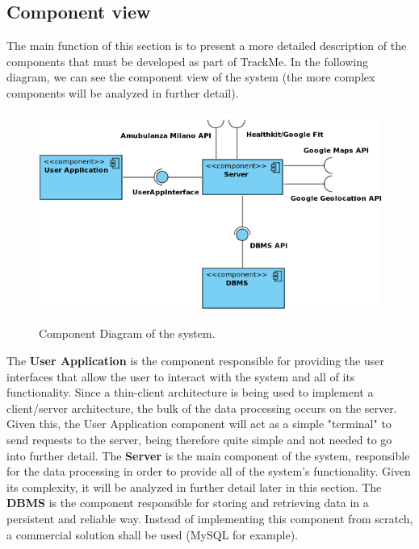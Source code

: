 \documentclass[12pt]{article}
\begin{document}
\subsection{Component view}
The main function of this section is to present a more detailed description of the components that must be
developed as part of TrackMe. In the following diagram, we can see the component view of the system (the
more complex components will be analyzed in further detail).

\begin{figure}[H]
\centering
\includegraphics[scale=0.5]{ComponentDiagram1.png}
\label{fig:ComponentDiagram1}
\caption{Component Diagram of the system.}
\end{figure}
\newpage
\noindent 
The \textbf{User Application} is the component responsible for providing the user interfaces that allow
the user to interact with the system and all of its functionality. Since a thin-client architecture is being
used to implement a client/server architecture, the bulk of the data processing occurs on the server.
Given this, the User Application component will act as a simple "terminal" to send requests to the server,
being therefore quite simple and not needed to go into further detail.
\newline \noindent The \textbf{Server} is the main component of the system, responsible for the data
processing in order to provide all of the system’s functionality. Given its complexity, it will be analyzed
in further detail later in this section.
\newline \noindent The \textbf{DBMS} is the component responsible for storing and retrieving data in a 
persistent and reliable way. Instead of implementing this component from scratch, a commercial solution 
shall be used (MySQL for example).
\end{document}

